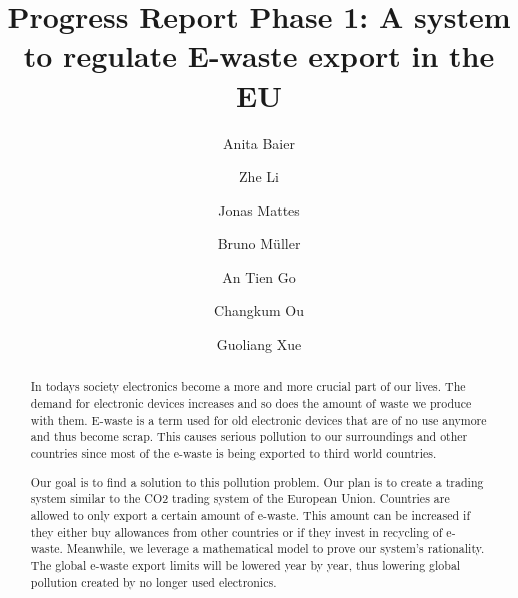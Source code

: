 \documentclass[sigchi-a, authorversion]{acmart}
\begin{document}
 
\title{Progress Report Phase 1: A system to regulate E-waste export in the EU}

\author{Anita Baier}

\author{Zhe Li}

\author{Jonas Mattes}

\author{Bruno M\"uller}

\author{An Tien Go}

\author{Changkum Ou}

\author{Guoliang Xue}




\begin{abstract}

  In todays society electronics become a more and more crucial part of our lives. 
  The demand for electronic devices increases and so does the amount of waste we produce with them. 
  E-waste is a term used for old electronic devices that are of no use anymore and thus become scrap. 
  This causes serious pollution to our surroundings and other countries since most of the e-waste is 
  being exported to third world countries.
  
  Our goal is to find a solution to this pollution problem. Our plan is to create a trading system similar 
  to the CO2 trading system of the European Union. Countries are allowed to only export a certain amount of e-waste. 
  This amount can be increased if they either buy allowances from other countries or if they invest in recycling of e-waste. 
  Meanwhile, we leverage a mathematical model to prove our system's rationality.
  The global e-waste export limits will be lowered year by year, thus lowering global pollution created by no longer
  used electronics.  
  
\end{abstract}
\end{document}

